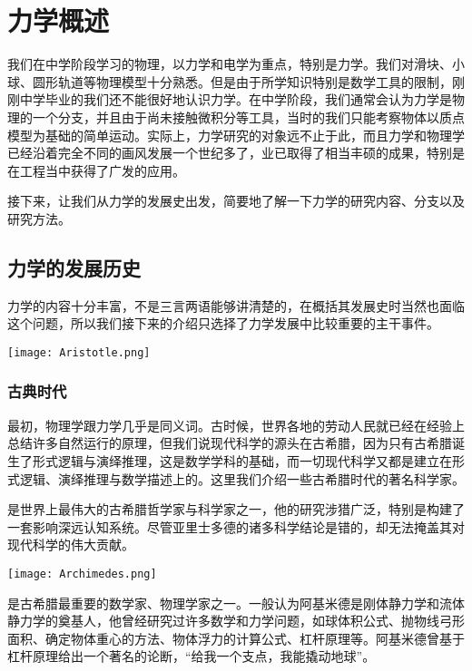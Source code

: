 \section{力学概述}

{\itshapeCJK
    我们在中学阶段学习的物理，以力学和电学为重点，特别是力学。我们对滑块、小球、圆形轨道等物理模型十分熟悉。但是由于所学知识特别是数学工具的限制，刚刚中学毕业的我们还不能很好地认识力学。在中学阶段，我们通常会认为力学是物理的一个分支，并且由于尚未接触微积分等工具，当时的我们只能考察物体以质点模型为基础的简单运动。实际上，力学研究的对象远不止于此，而且力学和物理学已经沿着完全不同的画风发展一个世纪多了，业已取得了相当丰硕的成果，特别是在工程当中获得了广发的应用。

接下来，让我们从力学的发展史出发，简要地了解一下力学的研究内容、分支以及研究方法。
}

\subsection{力学的发展历史}

力学的内容十分丰富，不是三言两语能够讲清楚的，在概括其发展史时当然也面临这个问题，所以我们接下来的介绍只选择了力学发展中比较重要的主干事件。

\begin{marginparfigure}
    \centering
    \texttt{[image: Aristotle.png]}
\end{marginparfigure}


\subsubsection{古典时代}

最初，物理学跟力学几乎是同义词。古时候，世界各地的劳动人民就已经在经验上总结许多自然运行的原理，但我们说现代科学的源头在古希腊，因为只有古希腊诞生了形式逻辑与演绎推理，这是数学学科的基础，而一切现代科学又都是建立在形式逻辑、演绎推理与数学描述上的。这里我们介绍一些古希腊时代的著名科学家。

是世界上最伟大的古希腊哲学家与科学家之一，他的研究涉猎广泛，特别是构建了一套影响深远认知系统。尽管亚里士多德的诸多科学结论是错的，却无法掩盖其对现代科学的伟大贡献。


\begin{marginparfigure}
    \centering
    \texttt{[image: Archimedes.png]}
\end{marginparfigure}

是古希腊最重要的数学家、物理学家之一。一般认为阿基米德是刚体静力学和流体静力学的奠基人，他曾经研究过许多数学和力学问题，如球体积公式、抛物线弓形面积、确定物体重心的方法、物体浮力的计算公式、杠杆原理等。阿基米德曾基于杠杆原理给出一个著名的论断，“给我一个支点，我能撬动地球”。

